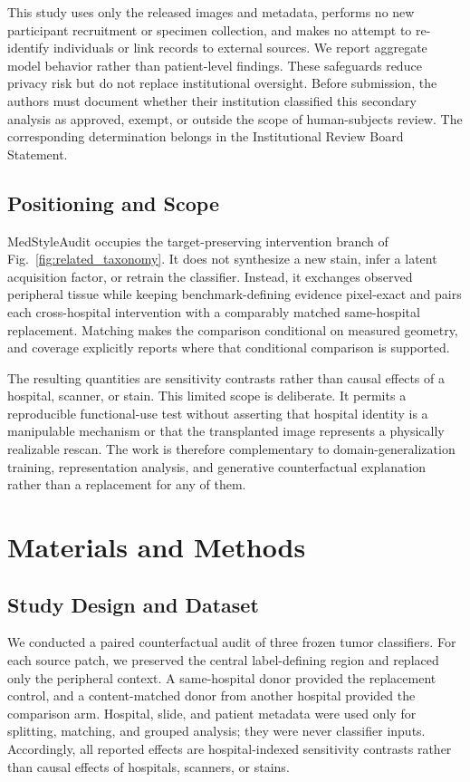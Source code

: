 \documentclass[notspecified,article,submit,moreauthors]{Definitions/mdpi}
\begin{document}
This study uses only the released images and metadata, performs no new
participant recruitment or specimen collection, and makes no attempt to
re-identify individuals or link records to external sources. We report
aggregate model behavior rather than patient-level findings. These safeguards
reduce privacy risk but do not replace institutional oversight. Before
submission, the authors must document whether their institution classified
this secondary analysis as approved, exempt, or outside the scope of
human-subjects review. The corresponding determination belongs in the
Institutional Review Board Statement.

\subsection{Positioning and Scope}

MedStyleAudit occupies the target-preserving intervention branch of
Fig.~\ref{fig:related_taxonomy}. It does not synthesize a new stain, infer a
latent acquisition factor, or retrain the classifier. Instead, it exchanges
observed peripheral tissue while keeping benchmark-defining evidence
pixel-exact and pairs each cross-hospital intervention with a comparably
matched same-hospital replacement. Matching makes the comparison conditional
on measured geometry, and coverage explicitly reports where that conditional
comparison is supported.

The resulting quantities are sensitivity contrasts rather than causal
effects of a hospital, scanner, or stain. This limited scope is deliberate.
It permits a reproducible functional-use test without asserting that hospital
identity is a manipulable mechanism or that the transplanted image represents
a physically realizable rescan. The work is therefore complementary to
domain-generalization training, representation analysis, and generative
counterfactual explanation rather than a replacement for any of them.

\section{Materials and Methods}
\label{sec:methods}

\subsection{Study Design and Dataset}

We conducted a paired counterfactual audit of three frozen tumor classifiers.
For each source patch, we preserved the central label-defining region and
replaced only the peripheral context. A same-hospital donor provided the
replacement control, and a content-matched donor from another hospital
provided the comparison arm. Hospital, slide, and patient metadata were used
only for splitting, matching, and grouped analysis; they were never classifier
inputs. Accordingly, all reported effects are hospital-indexed sensitivity
contrasts rather than causal effects of hospitals, scanners, or stains.
\end{document}
